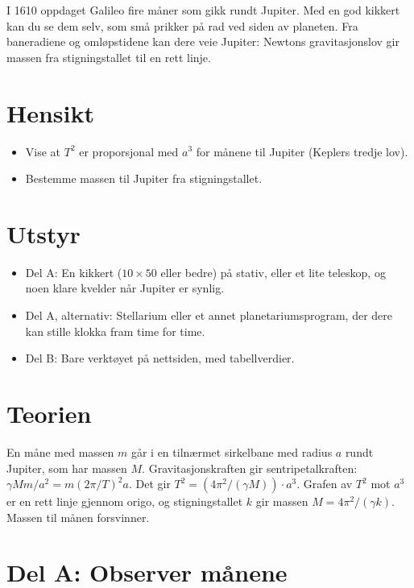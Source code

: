 \documentclass[11pt]{article}
\begin{document}

I 1610 oppdaget Galileo fire måner som gikk rundt Jupiter. Med en god kikkert kan du se dem selv, som små prikker på rad ved siden av planeten. Fra baneradiene og omløpstidene kan dere veie Jupiter: Newtons gravitasjonslov gir massen fra stigningstallet til en rett linje.

\section*{Hensikt}

\begin{itemize}
\item Vise at $T^{2}$ er proporsjonal med $a^{3}$ for månene til Jupiter (Keplers tredje lov).
\item Bestemme massen til Jupiter fra stigningstallet.
\end{itemize}

\section*{Utstyr}

\begin{itemize}
\item Del A: En kikkert ($10 \times 50$ eller bedre) på stativ, eller et lite teleskop, og noen klare kvelder når Jupiter er synlig.
\item Del A, alternativ: Stellarium eller et annet planetariumsprogram, der dere kan stille klokka fram time for time.
\item Del B: Bare verktøyet på nettsiden, med tabellverdier.
\end{itemize}

\section*{Teorien}

En måne med massen $m$ går i en tilnærmet sirkelbane med radius $a$ rundt Jupiter, som har massen $M$. Gravitasjonskraften gir sentripetalkraften: $γMm/a^{2} = m(2π/T)^{2}a$. Det gir $T^{2} = (4π^{2}/(γM)) \cdot a^{3}$. Grafen av $T^{2}$ mot $a^{3}$ er en rett linje gjennom origo, og stigningstallet $k$ gir massen $M = 4π^{2}/(γk)$. Massen til månen forsvinner.

\section*{Del A: Observer månene}
\end{document}
